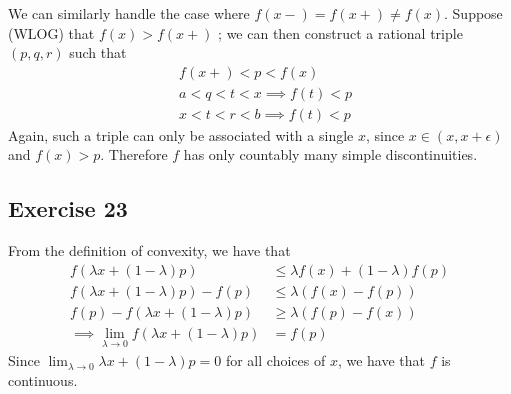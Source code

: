 We can similarly handle the case where $f(x-) = f(x+) \neq f(x)$. Suppose (WLOG) that $f(x) > f(x+)$ ; 
we can then construct a rational triple $(p, q, r)$ such that
\begin{align*}
        &f(x+) < p < f(x) \\ 
        &a < q < t < x \implies f(t) < p \\
        &x < t < r < b \implies f(t) < p 
\end{align*}
Again, such a triple can only be associated with a single $x$, since $x \in (x, x + \epsilon)$ and
$f(x) > p$. Therefore $f$ has only countably many simple discontinuities.

\subsection{Exercise 23}
From the definition of convexity, we have that
\begin{align*}
        f(\lambda x + (1 - \lambda) p) &\leq \lambda f(x) + (1 - \lambda) f(p) \\
        f(\lambda x + (1 - \lambda) p) - f(p) &\leq \lambda (f(x) - f(p)) \\
        f(p) - f(\lambda x + (1 - \lambda) p) &\geq \lambda (f(p) - f(x)) \\
        \implies \lim_{\lambda \to 0} f(\lambda x + (1 - \lambda) p) &= f(p)
\end{align*}
Since $\lim_{\lambda \to 0} \lambda x + (1 - \lambda) p = 0$ for all choices of $x$, we have that $f$ 
is continuous.
